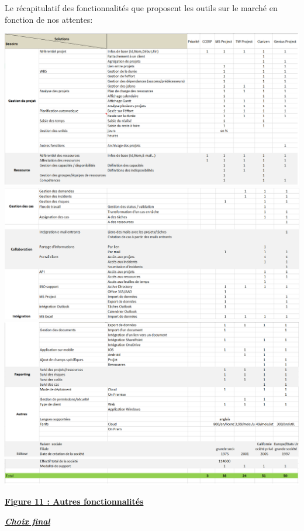 \documentclass[11pt]{report}
\begin{document}
Le récapitulatif des fonctionnalités que proposent les outils sur le marché en fonction de nos attentes:
\begin{center}
\includegraphics[scale=0.6]{images/figure12.png}
\includegraphics[scale=0.6]{images/figure13.png}
\includegraphics[scale=0.6]{images/figure14.png}
\includegraphics[scale=0.6]{images/figure15.png}    
\quad

\underline{\textbf{Figure 11 : Autres fonctionnalités}}
\end{center}

\hspace{1cm} \underline{\textbf{\textit{Choix final}}}
\quad
\end{document}

